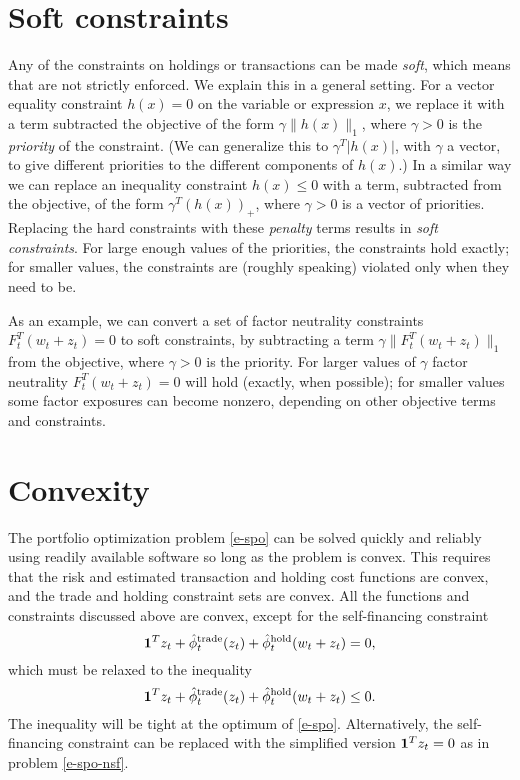 \documentclass[openany]{now}
\newcommand{\trcosthat}{\hat \phi^\mathrm{trade}}
\newcommand{\hldcosthat}{\hat \phi^\mathrm{hold}}
\begin{document}
\section{Soft constraints}
Any of the constraints on holdings or transactions can be made \emph{soft},
which means that are not strictly enforced.
We explain this in a general setting.
For a vector equality constraint $h(x)=0$ on the variable or expression $x$, we replace
it with a term subtracted the objective of the form
$\gamma \|h(x)\|_1$,
where $\gamma > 0$ is the \emph{priority} of the constraint.
(We can generalize this to $\gamma^T |h(x)|$, with $\gamma$ a vector, to give
different priorities to the different components of $h(x)$.)
In a similar way we can replace an inequality constraint $h(x)\leq 0$ with
a term, subtracted from the objective, of the form $\gamma^T(h(x))_+$,
where $\gamma >0$ is a vector of priorities.
Replacing the hard constraints with these \emph{penalty} terms results in
\emph{soft constraints}.  For large enough values of the priorities, the
constraints hold exactly; for smaller values, the constraints are (roughly speaking)
violated only when they need to be.

As an example, we can convert a set of factor neutrality constraints
$F_t^T (w_t+z_t)=0$ to soft constraints,
by subtracting a term $\gamma \| F_t^T (w_t+z_t) \|_1$ from the objective,
where $\gamma>0$ is the priority.
For larger values of $\gamma$ factor neutrality $ F_t^T (w_t+z_t)=0$
will hold (exactly, when possible); for smaller
values some factor exposures can become nonzero, depending on other
objective terms and constraints.

\section{Convexity}\label{s-convexity}
The portfolio optimization problem \eqref{e-spo}
can be solved quickly and reliably
using readily available software so long as the problem is convex.
This requires that the risk and estimated transaction
and holding cost functions are convex, and the trade and holding constraint
sets are convex.
All the functions and constraints discussed above are convex,
except for the self-financing constraint
\[
\ones^Tz_t + \trcosthat_t(z_t) + \hldcosthat_t(w_t + z_t) = 0,
\]
which must be relaxed to the inequality
\[
\ones^Tz_t + \trcosthat_t(z_t) + \hldcosthat_t(w_t + z_t) \leq 0.
\]
The inequality will be tight at the optimum of \eqref{e-spo}.
Alternatively, the self-financing constraint can be replaced with the
simplified version $\mathbf 1^Tz_t = 0$ as in problem \eqref{e-spo-nsf}.
\end{document}
